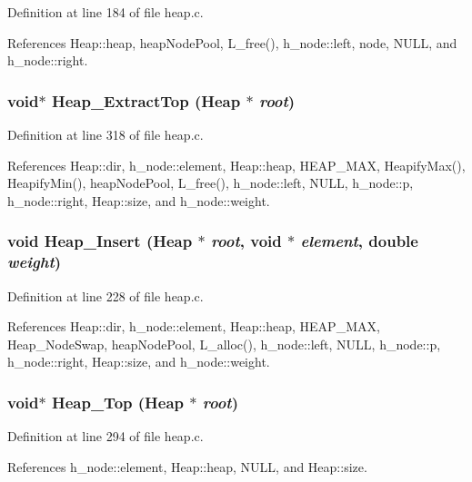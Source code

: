 Definition at line 184 of file heap.c.

References Heap::heap, heap\-Node\-Pool, L\_\-free(), h\_\-node::left, node, NULL, and h\_\-node::right.
\subsubsection{\setlength{\rightskip}{0pt plus 5cm}void$\ast$ Heap\_\-Extract\-Top (\bf{Heap} $\ast$ {\em root})}\label{heap_8c_6a7a4ed0f9b50b8e892c27589f6e92e5}




Definition at line 318 of file heap.c.

References Heap::dir, h\_\-node::element, Heap::heap, HEAP\_\-MAX, Heapify\-Max(), Heapify\-Min(), heap\-Node\-Pool, L\_\-free(), h\_\-node::left, NULL, h\_\-node::p, h\_\-node::right, Heap::size, and h\_\-node::weight.
\subsubsection{\setlength{\rightskip}{0pt plus 5cm}void Heap\_\-Insert (\bf{Heap} $\ast$ {\em root}, void $\ast$ {\em element}, double {\em weight})}\label{heap_8c_c86e67aa3d315dce4c37dd848b3ad7b7}




Definition at line 228 of file heap.c.

References Heap::dir, h\_\-node::element, Heap::heap, HEAP\_\-MAX, Heap\_\-Node\-Swap, heap\-Node\-Pool, L\_\-alloc(), h\_\-node::left, NULL, h\_\-node::p, h\_\-node::right, Heap::size, and h\_\-node::weight.
\subsubsection{\setlength{\rightskip}{0pt plus 5cm}void$\ast$ Heap\_\-Top (\bf{Heap} $\ast$ {\em root})}\label{heap_8c_3860aafa490cda2ad1d98d6212f972d0}




Definition at line 294 of file heap.c.

References h\_\-node::element, Heap::heap, NULL, and Heap::size.
